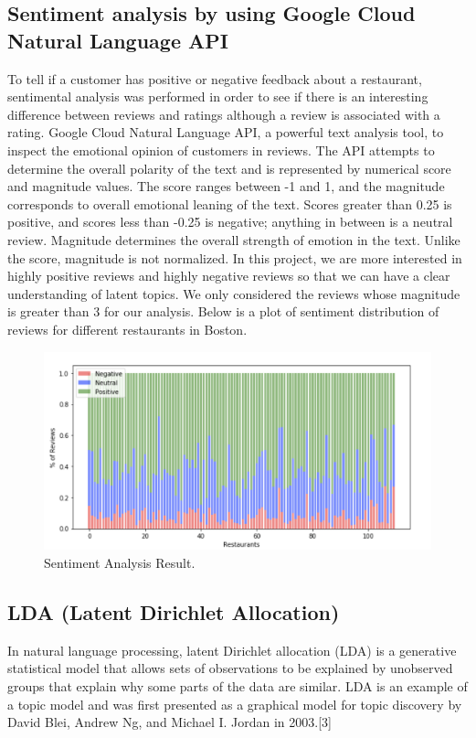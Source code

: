 \documentclass[a4paper]{article}
\begin{document}
\subsection{Sentiment analysis by using Google Cloud Natural Language API}
To tell if a customer has positive or negative feedback about a restaurant, sentimental analysis was performed in order to see if there is an interesting difference between reviews and ratings although a review is associated with a rating. 
Google Cloud Natural Language API, a powerful text analysis tool, to inspect the emotional opinion of customers in reviews. The API attempts to determine the overall polarity of the text and is represented by numerical score and magnitude values. The score ranges between -1 and 1, and the magnitude corresponds to overall emotional leaning of the text. Scores greater than 0.25 is positive, and scores less than -0.25 is negative; anything in between is a neutral review. Magnitude determines the overall strength of emotion in the text. Unlike the score, magnitude is not normalized. 
In this project, we are more interested in highly positive reviews and highly negative reviews so that we can have a clear understanding of latent topics. We only considered the reviews whose magnitude is greater than 3 for our analysis. Below is a plot of sentiment distribution of reviews for different restaurants in Boston. 

\begin{figure}[htbp]
\centering
\includegraphics[width=1\textwidth]{Picture5.png}
\caption{\label{fig:data}Sentiment Analysis Result. }
\end{figure}

\subsection{LDA (Latent Dirichlet Allocation)}
In natural language processing, latent Dirichlet allocation (LDA) is a generative statistical model that allows sets of observations to be explained by unobserved groups that explain why some parts of the data are similar. LDA is an example of a topic model and was first presented as a graphical model for topic discovery by David Blei, Andrew Ng, and Michael I. Jordan in 2003.[3] 
\end{document}
